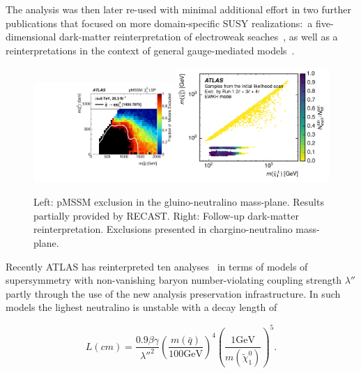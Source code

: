 The analysis was then later re-used with minimal additional effort in two further publications that focused on more domain-specific SUSY realizations:~a five-dimensional dark-matter reinterpretation of electroweak seaches~\cite{Aaboud:2016wna}, as well as a reinterpretations in the context of general gauge-mediated models~\cite{ATLAS-CONF-2016-033}.

\begin{figure}[t]
\begin{center}
\includegraphics[width=0.48\textwidth,angle=0]{ch5-figures/pMSSM.pdf}\includegraphics[width=0.52\textwidth,angle=0]{ch5-figures/DM.pdf}

\end{center}
\caption{
Left: pMSSM exclusion in the gluino-neutralino mass-plane. Results partially provided by RECAST.
Right: Follow-up dark-matter reinterpretation. Exclusions presented in chargino-neutralino mass-plane.
}
\label{fig:recast-cc}
\end{figure}

Recently ATLAS has reinterpreted ten analyses~\cite{ATLAS-CONF-2018-003} in terms of models of supersymmetry with non-vanishing baryon number-violating coupling strength $\lambda''$ partly through the use of the new analysis preservation infrastructure. In such models the lighest neutralino is unstable with a decay length of

\begin{equation}
  L(cm) = \frac{0.9\beta\gamma}{{\lambda''}^2} \left(\frac{m(\bar{q})}{100\mathrm{GeV}}\right)^4\left(\frac{1\mathrm{GeV}}{m(\tilde{\chi}_1^0)}\right)^5.
\end{equation}


